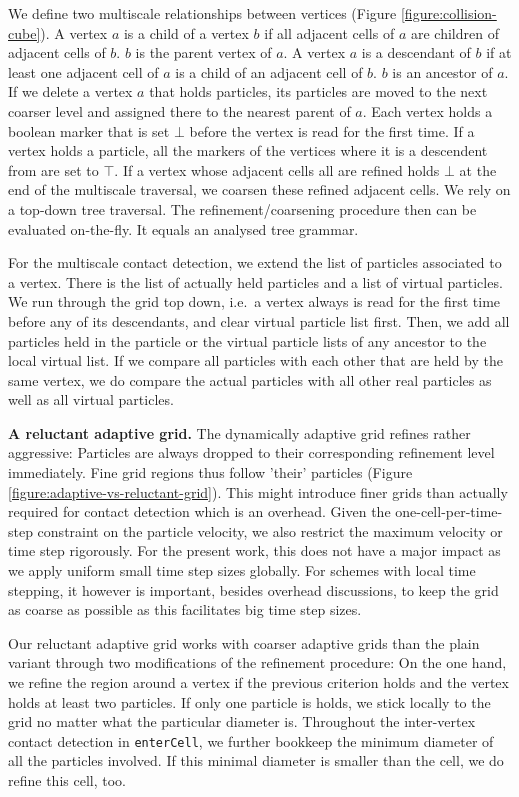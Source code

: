 \documentclass[times,12pt]{article}
\begin{document}
We define two multiscale relationships between vertices (Figure
\ref{figure:collision-cube}).
A vertex $a$ is a child of a vertex $b$ if all adjacent cells of $a$ are
children of adjacent cells of $b$. $b$ is the parent vertex of $a$.
A vertex $a$ is a descendant of $b$ if at least one adjacent cell of $a$ is a
child of an adjacent cell of $b$. $b$ is an ancestor of $a$.
If we delete a vertex $a$ that holds particles, its particles are moved to the
next coarser level and assigned there to the nearest parent of $a$.
Each vertex holds a boolean marker that is set $\bot $ before the vertex is
read for the first time.
If a vertex holds a particle, all the markers of the vertices where it is a
descendent from are set to $\top$.
If a vertex whose adjacent cells all are refined holds $\bot$ at the end of the
multiscale traversal, we coarsen these refined adjacent cells.
We rely on a top-down tree traversal.
The refinement/coarsening procedure then can be evaluated on-the-fly.
It equals an analysed tree grammar.

For the multiscale contact detection, we extend the list of particles associated
to a vertex. 
There is the list of actually held particles and a list of virtual particles. 
We run through the grid top down, i.e.~a vertex always is read for the first
time before any of its descendants, and clear virtual particle list first.
Then, we add all particles held in the particle or the virtual particle lists of
any ancestor to the local virtual list.
If we compare all particles with each other that are held by the same vertex, we
do compare the actual particles with all other real particles as well as all
virtual particles.

{\bf A reluctant adaptive grid.}
The dynamically adaptive grid refines rather aggressive: Particles are always
dropped to their corresponding refinement level immediately. 
Fine grid regions thus follow 'their' particles (Figure
\ref{figure:adaptive-vs-reluctant-grid}).
This might introduce finer grids than actually required for contact detection
which is an overhead.
Given the one-cell-per-time-step constraint on the particle velocity, we also
restrict the maximum velocity or time step rigorously.
For the present work, this does not have a major impact as we apply uniform
small time step sizes globally. 
For schemes with local time stepping, it however is important, besides overhead
discussions, to keep the grid as coarse as possible as this facilitates big
time step sizes.

Our reluctant adaptive grid works with coarser adaptive grids than the plain
variant through two modifications of the refinement procedure: 
On the one hand, we refine the region around a vertex if the previous criterion
holds and the vertex holds at least two particles.
If only one particle is holds, we stick locally to the grid no matter what the
particular diameter is.
Throughout the inter-vertex contact detection in \texttt{enterCell}, we further
bookkeep the minimum diameter of all the particles involved. 
If this minimal diameter is smaller than the cell, we do refine this cell, too.
\end{document}
